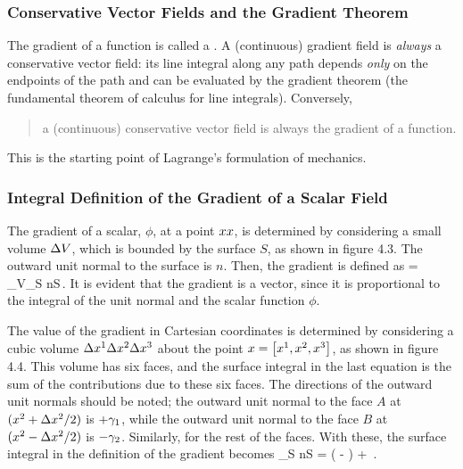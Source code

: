 \subsubsection{Conservative Vector Fields and the Gradient Theorem}
The gradient of a function is called a . A (continuous) gradient field is \emph{always} a conservative vector field: its line integral along any path depends \emph{only} on the endpoints of the path and can be evaluated by the gradient theorem (the fundamental theorem of calculus for line integrals). Conversely, 
\begin{quote}
a (continuous) conservative vector field is always the gradient of a function.
\end{quote}
This is the starting point of Lagrange's formulation of mechanics.


\subsubsection{Integral Definition of the Gradient of a Scalar Field}
The gradient of a scalar, $\phi$, at a point $x x$, is determined by considering a small volume $\Delta V$, which is bounded by the surface $S$, as shown in figure 4.3. The outward unit normal to the surface is $n$. Then, the gradient is defined as
\beq
\grad\phi = \lim_{\diff V}\int_S \phi n\dx S\,.
\eeq
It is evident that the gradient is a vector, since it is proportional to the integral of the unit normal and the scalar function $\phi$.

The value of the gradient in Cartesian coordinates is determined by considering a cubic volume $\Delta{x}^{1}\Delta{x}^{2}\Delta{x}^{3}$ about the point $x = \left[{{x}^{1}, {x}^{2}, {x}^{3}}\right]$, as shown in figure 4.4. This volume has six faces, and the surface integral in the last equation is the sum of the contributions due to these six faces. The directions of the outward unit normals should be noted; the outward unit normal to the face $A$ at $({x}^{2} + \Delta{x}^{2}/2)$ is $+\gamma_{1}$, while the outward unit normal to the face $B$ at $({x}^{2} - \Delta{x}^{2}/2)$ is $-\gamma_{2}$. Similarly, for the rest of the faces. With these, the surface integral in the definition of the gradient becomes
\beq
\int_S \phi n\dx S = \diff\cntens{}\diff\cntens{}
    \left(
    \phi{} - 
    \phi{}
    \right)
    + \dotsb\,.
\eeq

